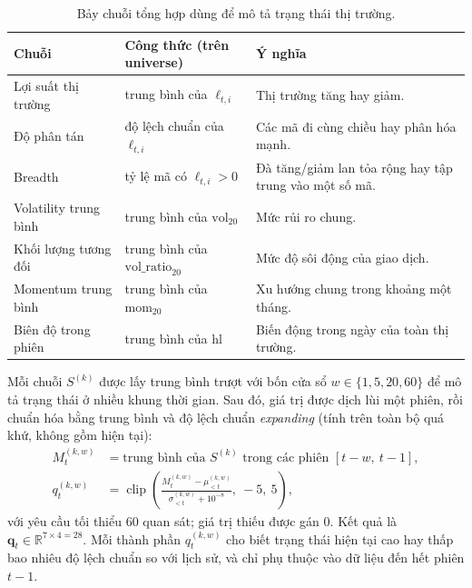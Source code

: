 \documentclass[a4paper,12pt]{article}
\DeclareMathOperator{\clip}{clip}
\begin{document}
\begin{table}[H]\centering\small
\caption{Bảy chuỗi tổng hợp dùng để mô tả trạng thái thị trường.}
\label{tab:mkt}
\renewcommand{\arraystretch}{1.3}
\begin{tabularx}{\textwidth}{@{}>{\raggedright\arraybackslash}p{3.2cm}>{\raggedright\arraybackslash}p{4.6cm}X@{}}
\toprule
\textbf{Chuỗi} & \textbf{Công thức (trên universe)} & \textbf{Ý nghĩa}\\\midrule
Lợi suất thị trường & trung bình của $\ell_{t,i}$ & Thị trường tăng hay giảm.\\
Độ phân tán & độ lệch chuẩn của $\ell_{t,i}$ & Các mã đi cùng chiều hay phân hóa mạnh.\\
Breadth & tỷ lệ mã có $\ell_{t,i}>0$ & Đà tăng/giảm lan tỏa rộng hay tập trung vào một số mã.\\
Volatility trung bình & trung bình của $\mathrm{vol}_{20}$ & Mức rủi ro chung.\\
Khối lượng tương đối & trung bình của $\mathrm{vol\_ratio}_{20}$ & Mức độ sôi động của giao dịch.\\
Momentum trung bình & trung bình của $\mathrm{mom}_{20}$ & Xu hướng chung trong khoảng một tháng.\\
Biên độ trong phiên & trung bình của $\mathrm{hl}$ & Biến động trong ngày của toàn thị trường.\\
\bottomrule
\end{tabularx}
\end{table}

Mỗi chuỗi $S^{(k)}$ được lấy trung bình trượt với bốn cửa sổ $w\in\{1,5,20,60\}$ để mô tả trạng thái ở nhiều khung thời gian. Sau đó, giá trị được dịch lùi một phiên, rồi chuẩn hóa bằng trung bình và độ lệch chuẩn \emph{expanding} (tính trên toàn bộ quá khứ, không gồm hiện tại):
\begin{align}
    M^{(k,w)}_t&=\text{trung bình của } S^{(k)} \text{ trong các phiên } [t-w,\ t-1],\\
    q^{(k,w)}_t&=\clip\!\left(\frac{M^{(k,w)}_t-\mu^{(k,w)}_{<t}}{\sigma^{(k,w)}_{<t}+10^{-8}},\ -5,\ 5\right),
\end{align}
với yêu cầu tối thiểu 60 quan sát; giá trị thiếu được gán $0$. Kết quả là $\mathbf{q}_t\in\mathbb{R}^{7\times4=28}$. Mỗi thành phần $q^{(k,w)}_t$ cho biết trạng thái hiện tại cao hay thấp bao nhiêu độ lệch chuẩn so với lịch sử, và chỉ phụ thuộc vào dữ liệu đến hết phiên $t-1$.
\end{document}
